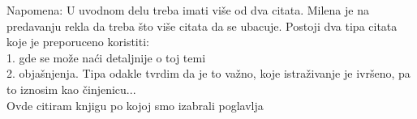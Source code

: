 \documentclass[a4paper]{article}
\newtheorem{primer}{Primer}[section]
\begin{document}


Napomena: U uvodnom delu treba imati više od dva citata. Milena je na predavanju rekla da treba što više citata da se ubacuje. Postoji dva tipa citata koje je preporuceno koristiti:\\
1. gde se može naći detaljnije o toj temi\\
2. objašnjenja. Tipa odakle tvrdim da je to važno, koje istraživanje je ivršeno, pa to iznosim kao činjenicu...\\
Ovde \cite{knjiga} citiram knjigu po kojoj smo izabrali poglavlja













\end{document}
